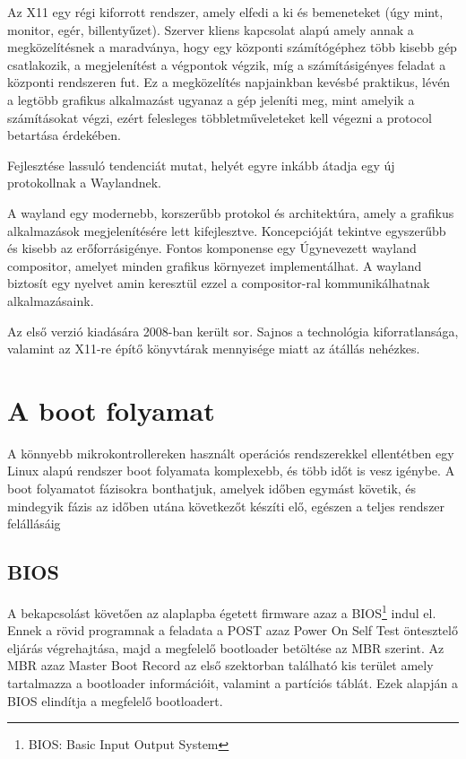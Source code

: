 Az X11 egy régi kiforrott rendszer, amely elfedi a ki és bemeneteket (úgy mint, monitor, egér, billentyűzet). Szerver kliens kapcsolat alapú amely annak a megközelítésnek a maradványa, hogy egy központi számítógéphez több
kisebb gép csatlakozik, a megjelenítést a végpontok végzik, míg a számításigényes feladat a központi rendszeren fut. Ez a megközelítés napjainkban kevésbé praktikus, lévén a legtöbb grafikus alkalmazást ugyanaz a gép jeleníti meg,
mint amelyik a számításokat végzi, ezért felesleges többletműveleteket kell végezni a protocol betartása érdekében.

Fejlesztése lassuló tendenciát mutat, helyét egyre inkább átadja egy új protokollnak a Waylandnek.

\medskip

A wayland egy modernebb, korszerűbb protokol és architektúra, amely a grafikus alkalmazások megjelenítésére lett kifejlesztve. Koncepcióját tekintve egyszerűbb és kisebb az erőforrásigénye. Fontos komponense egy Úgynevezett
wayland compositor, amelyet minden grafikus környezet implementálhat. A wayland biztosít egy nyelvet amin keresztül ezzel a compositor-ral kommunikálhatnak alkalmazásaink.

Az első verzió kiadására 2008-ban került sor. Sajnos a technológia kiforratlansága, valamint az X11-re építő könyvtárak mennyisége miatt az átállás nehézkes.

\section{A boot folyamat}

A könnyebb mikrokontrollereken használt operációs rendszerekkel ellentétben egy Linux alapú rendszer boot folyamata komplexebb, és több időt is vesz igénybe. A boot folyamatot fázisokra bonthatjuk, amelyek időben egymást követik,
és mindegyik fázis az időben utána következőt készíti elő, egészen a teljes rendszer felállásáig

\subsection{BIOS}

A bekapcsolást követően az alaplapba égetett firmware azaz a BIOS\footnote{BIOS: Basic Input Output System} indul el. Ennek a rövid programnak a feladata a POST azaz Power On Self Test öntesztelő eljárás végrehajtása,
majd a megfelelő bootloader betöltése az MBR szerint. Az MBR azaz Master Boot Record az első szektorban található kis terület amely tartalmazza a bootloader információit, valamint a partíciós táblát. Ezek alapján a BIOS elindítja a
megfelelő bootloadert.

